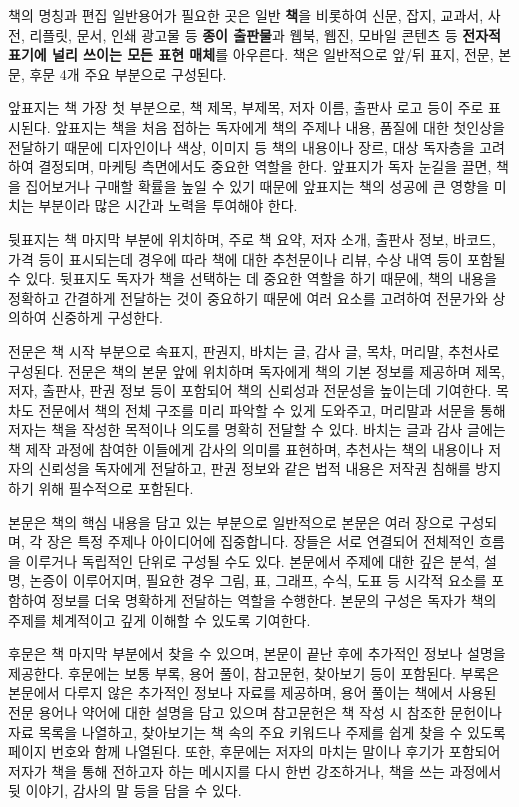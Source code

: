 \documentclass[
  letterpaper,
]{book}
\begin{document}
책의 명칭과 편집 일반용어가 필요한 곳은 일반 \textbf{책}을 비롯하여
신문, 잡지, 교과서, 사전, 리플릿, 문서, 인쇄 광고물 등 \textbf{종이
출판물}과 웹북, 웹진, 모바일 콘텐츠 등 \textbf{전자적 표기에 널리 쓰이는
모든 표현 매체}를 아우른다. 책은 일반적으로 앞/뒤 표지, 전문, 본문, 후문
4개 주요 부분으로 구성된다. \autocite{KCI2009}

앞표지는 책 가장 첫 부분으로, 책 제목, 부제목, 저자 이름, 출판사 로고
등이 주로 표시된다. 앞표지는 책을 처음 접하는 독자에게 책의 주제나 내용,
품질에 대한 첫인상을 전달하기 때문에 디자인이나 색상, 이미지 등 책의
내용이나 장르, 대상 독자층을 고려하여 결정되며, 마케팅 측면에서도 중요한
역할을 한다. 앞표지가 독자 눈길을 끌면, 책을 집어보거나 구매할 확률을
높일 수 있기 때문에 앞표지는 책의 성공에 큰 영향을 미치는 부분이라 많은
시간과 노력을 투여해야 한다.

뒷표지는 책 마지막 부분에 위치하며, 주로 책 요약, 저자 소개, 출판사
정보, 바코드, 가격 등이 표시되는데 경우에 따라 책에 대한 추천문이나
리뷰, 수상 내역 등이 포함될 수 있다. 뒷표지도 독자가 책을 선택하는 데
중요한 역할을 하기 때문에, 책의 내용을 정확하고 간결하게 전달하는 것이
중요하기 때문에 여러 요소를 고려하여 전문가와 상의하여 신중하게
구성한다.

전문은 책 시작 부분으로 속표지, 판권지, 바치는 글, 감사 글, 목차,
머리말, 추천사로 구성된다. 전문은 책의 본문 앞에 위치하며 독자에게 책의
기본 정보를 제공하며 제목, 저자, 출판사, 판권 정보 등이 포함되어 책의
신뢰성과 전문성을 높이는데 기여한다. 목차도 전문에서 책의 전체 구조를
미리 파악할 수 있게 도와주고, 머리말과 서문을 통해 저자는 책을 작성한
목적이나 의도를 명확히 전달할 수 있다. 바치는 글과 감사 글에는 책 제작
과정에 참여한 이들에게 감사의 의미를 표현하며, 추천사는 책의 내용이나
저자의 신뢰성을 독자에게 전달하고, 판권 정보와 같은 법적 내용은 저작권
침해를 방지하기 위해 필수적으로 포함된다.

본문은 책의 핵심 내용을 담고 있는 부분으로 일반적으로 본문은 여러 장으로
구성되며, 각 장은 특정 주제나 아이디어에 집중합니다. 장들은 서로
연결되어 전체적인 흐름을 이루거나 독립적인 단위로 구성될 수도 있다.
본문에서 주제에 대한 깊은 분석, 설명, 논증이 이루어지며, 필요한 경우
그림, 표, 그래프, 수식, 도표 등 시각적 요소를 포함하여 정보를 더욱
명확하게 전달하는 역할을 수행한다. 본문의 구성은 독자가 책의 주제를
체계적이고 깊게 이해할 수 있도록 기여한다.

후문은 책 마지막 부분에서 찾을 수 있으며, 본문이 끝난 후에 추가적인
정보나 설명을 제공한다. 후문에는 보통 부록, 용어 풀이, 참고문헌,
찾아보기 등이 포함된다. 부록은 본문에서 다루지 않은 추가적인 정보나
자료를 제공하며, 용어 풀이는 책에서 사용된 전문 용어나 약어에 대한
설명을 담고 있으며 참고문헌은 책 작성 시 참조한 문헌이나 자료 목록을
나열하고, 찾아보기는 책 속의 주요 키워드나 주제를 쉽게 찾을 수 있도록
페이지 번호와 함께 나열된다. 또한, 후문에는 저자의 마치는 말이나 후기가
포함되어 저자가 책을 통해 전하고자 하는 메시지를 다시 한번 강조하거나,
책을 쓰는 과정에서 뒷 이야기, 감사의 말 등을 담을 수 있다.
\end{document}

